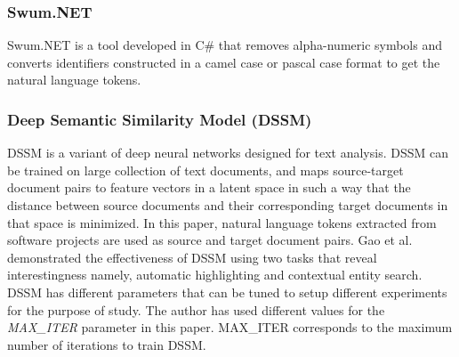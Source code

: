 \documentclass[conference]{IEEEtran}
\begin{document}
\subsubsection{Swum.NET}
Swum.NET is a tool developed in C\# that removes alpha-numeric symbols 
and converts identifiers constructed in a camel case or pascal case format to get the natural language tokens.    
\subsubsection{Deep Semantic Similarity Model (DSSM)}
DSSM is a variant of deep neural networks designed for text analysis. DSSM can be trained on large collection of text documents, and maps source-target document pairs to feature vectors in a latent space in such a way that the distance between source documents and their corresponding target documents in that space is minimized. In this paper, natural language tokens extracted from software projects are used as source and target document pairs. Gao et al.~\cite{gao:interesting:emnlp} demonstrated the effectiveness of DSSM using two tasks that reveal interestingness namely, automatic highlighting and contextual entity search. 
DSSM has different parameters that can be tuned to setup different experiments for the purpose of study. The author has used different values for the \textit{MAX\_ITER} parameter in this paper. MAX\_ITER corresponds to the maximum number of iterations to train DSSM.   
\end{document}
